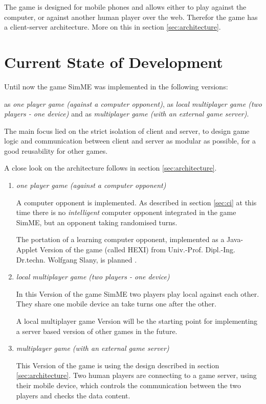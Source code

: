 		The game is designed for mobile phones and allows either to play against
		the computer, or against another human player over the web. Therefor the
		game has a client-server architecture. More on this in section
		\ref{sec:architecture}.


\section{Current State of Development}

	Until now the game SimME was implemented in the following versions:

	\noindent as \emph{one player game (against a computer opponent)}, as
	\emph{local multiplayer game (two players - one device)} and as
	\textit{multiplayer game (with an external game server)}.

	The main focus lied on the strict isolation of client and server, to design
	game logic and communication between client and server as modular as possible,
	for a good reusability for other games.
	
	A close look on the architecture follows in section \ref{sec:architecture}.
	
	\begin{enumerate}
	
		\item \textit{one player game (against a computer opponent)}
		
			A computer opponent is implemented. As described in section
			\ref{sec:ci} at this time there is no \textit{intelligent} computer
			opponent integrated in the game SimME, but an opponent taking
			randomised turns.
			
			The portation of a learning computer opponent, implemented as a
			Java-Applet Version of the game (called HEXI) from Univ.-Prof.
			Dipl.-Ing. Dr.techn. Wolfgang Slany, is planned \cite{slany_paper}.
			
		\item \textit{local multiplayer game (two players - one device)}
		
			In this Version of the game SimME two players play local against
			each other. They share one mobile device an take turns one after the
			other.
			
			A local multiplayer game Version will be the starting point
			for implementing a server based version of other games in the
			future.
			
		\item \textit{multiplayer game (with an external game server)}
		
			This Version of the game is using the design described in section
			\ref{sec:architecture}. Two human players are connecting to a game
			server, using their mobile device, which controls the communication
			between the two players and checks the data content.
			
	\end{enumerate}
	
